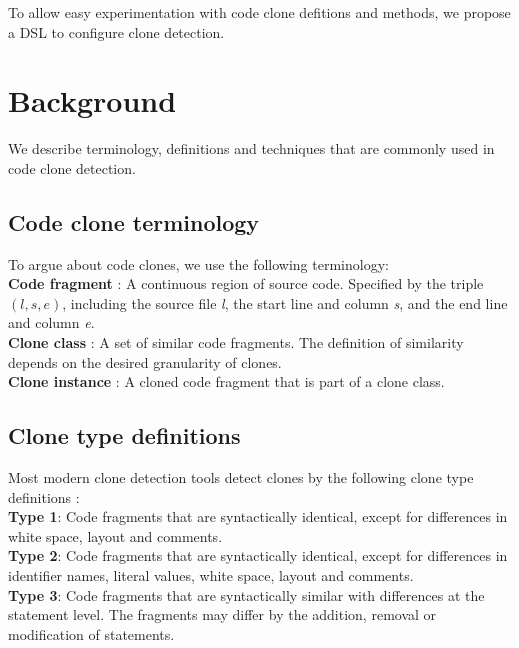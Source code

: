 \documentclass[sigplan,10pt,review,anonymous]{acmart}
\begin{document}
To allow easy experimentation with code clone defitions and methods, we propose a DSL to configure clone detection. 

\section{Background}
We describe terminology, definitions and techniques that are commonly used in code clone detection.

\subsection{Code clone terminology}
To argue about code clones, we use the following terminology:
\\ \textbf{Code fragment} \cite{svajlenko2019mutation}: A continuous region of source code. Specified by the triple $(l,s,e)$, including the source file \textit{l}, the start line and column \textit{s}, and the end line and column \textit{e}.
\\ \textbf{Clone class} \cite{roy2007survey}: A set of similar code fragments. The definition of similarity depends on the desired granularity of clones.
\\ \textbf{Clone instance} \cite{roy2007survey}: A cloned code fragment that is part of a clone class.

\subsection{Clone type definitions}
Most modern clone detection tools detect clones by the following clone type definitions \cite{svajlenko2014evaluating}:
\\ \textbf{Type 1}: Code fragments that are syntactically identical, except for differences in white space, layout and comments.
\\ \textbf{Type 2}: Code fragments that are syntactically identical, except for differences in identifier names, literal values, white space, layout and comments.
\\ \textbf{Type 3}: Code fragments that are syntactically similar with differences at the statement level. The fragments may differ by the addition, removal or modification of statements.
\end{document}
